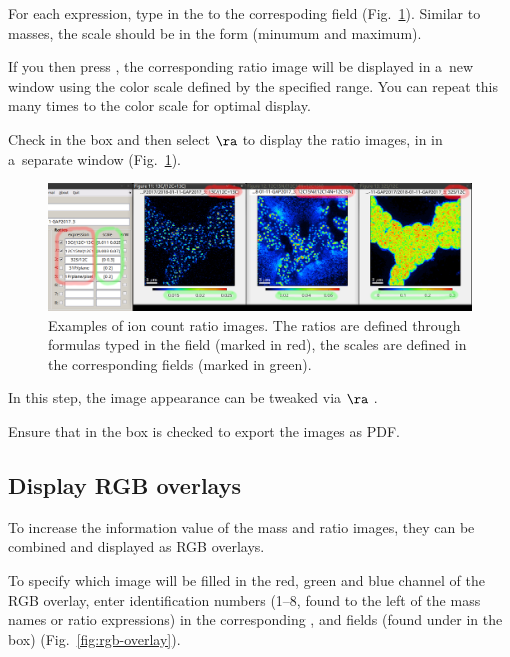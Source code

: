 \s For each expression, type in the  to the correspoding field (Fig.~\ref{fig:display-ratios}). Similar to masses, the scale should be in the form  (minumum and maximum). 

\bul If you then press , the corresponding ratio image will be displayed in a~new window using the color scale defined by the specified range. You can repeat this many times to  the color scale for optimal display.

\s Check  in the  box and then select  $\ra$  to display the ratio images, in in a~separate window (Fig.~\ref{fig:display-ratios}). 

\begin{figure}[!ht]
\centering
\includegraphics[width=\textwidth]{figs3/LANS-display-ratios}
\caption{\label{fig:display-ratios}%
Examples of ion count ratio images. The ratios are defined through formulas typed in the  field (marked in red), the scales are defined in the corresponding  fields (marked in green).}
\end{figure}

\nb
\bul In this step, the image appearance can be tweaked via  $\ra$ .

\bul Ensure that  in the  box is checked to export the images as PDF.


\subsection{Display RGB overlays}
\setcounter{step}{0}

\goldbox{}
To increase the information value of the mass and ratio images, they can be combined and displayed as RGB overlays.
\tcbe

\s To specify which image will be filled in the red, green and blue channel of the RGB overlay, enter identification numbers (1--8, found to the left of the mass names or ratio expressions) in the corresponding ,  and  fields (found under  in the  box) (Fig.~\ref{fig:rgb-overlay}).

